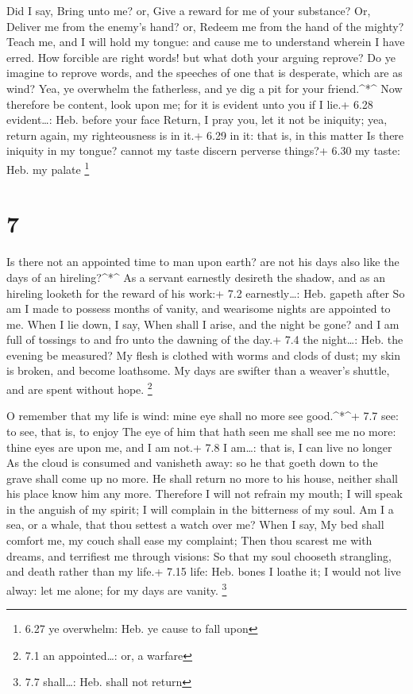  Did I say, Bring unto me? or, Give a reward for me of your
substance?  Or, Deliver me from the enemy's hand? or,
Redeem me from the hand of the mighty?  Teach me, and I
will hold my tongue: and cause me to understand wherein I have erred.
 How forcible are right words! but what doth your arguing
reprove?  Do ye imagine to reprove words, and the speeches
of one that is desperate, which are as wind?  Yea, ye
overwhelm the fatherless, and ye dig a pit for your friend.\^{}*\^{}
 Now therefore be content, look upon me; for it is evident
unto you if I lie.+ 6.28 evident\ldots: Heb. before your face
 Return, I pray you, let it not be iniquity; yea, return
again, my righteousness is in it.+ 6.29 in it: that is, in this matter
 Is there iniquity in my tongue? cannot my taste discern
perverse things?+ 6.30 my taste: Heb. my palate \footnote{6.27 ye
  overwhelm: Heb. ye cause to fall upon}

\hypertarget{section-6}{%
\section{7}\label{section-6}}

 Is there not an appointed time to man upon earth? are not
his days also like the days of an hireling?\^{}*\^{}  As a
servant earnestly desireth the shadow, and as an hireling looketh for
the reward of his work:+ 7.2 earnestly\ldots: Heb. gapeth after
 So am I made to possess months of vanity, and wearisome
nights are appointed to me.  When I lie down, I say, When
shall I arise, and the night be gone? and I am full of tossings to and
fro unto the dawning of the day.+ 7.4 the night\ldots: Heb. the evening
be measured?  My flesh is clothed with worms and clods of
dust; my skin is broken, and become loathsome.  My days are
swifter than a weaver's shuttle, and are spent without hope. \footnote{7.1
  an appointed\ldots: or, a warfare}

 O remember that my life is wind: mine eye shall no more see
good.\^{}*\^{}+ 7.7 see: to see, that is, to enjoy  The eye
of him that hath seen me shall see me no more: thine eyes are upon me,
and I am not.+ 7.8 I am\ldots: that is, I can live no longer
 As the cloud is consumed and vanisheth away: so he that
goeth down to the grave shall come up no more.  He shall
return no more to his house, neither shall his place know him any more.
 Therefore I will not refrain my mouth; I will speak in the
anguish of my spirit; I will complain in the bitterness of my soul.
 Am I a sea, or a whale, that thou settest a watch over me?
 When I say, My bed shall comfort me, my couch shall ease
my complaint;  Then thou scarest me with dreams, and
terrifiest me through visions:  So that my soul chooseth
strangling, and death rather than my life.+ 7.15 life: Heb. bones
 I loathe it; I would not live alway: let me alone; for my
days are vanity. \footnote{7.7 shall\ldots: Heb. shall not return}

